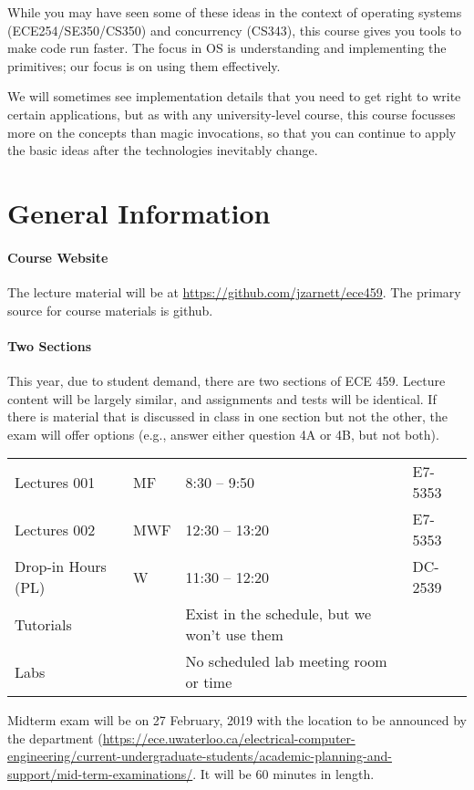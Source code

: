 \documentclass[letterpaper,10pt]{article}
\begin{document}
While you may have seen some of these ideas in the context of
operating systems (ECE254/SE350/CS350) and concurrency (CS343), this course gives you tools to make code run
faster. The focus in OS is understanding and implementing the
primitives; our focus is on using them effectively. 

We will sometimes see implementation details that you need to get right to write
certain applications, but as with any university-level course, this course
focusses more on the concepts than magic invocations, so that you can continue
to apply the basic ideas after the technologies inevitably change.


\section*{General Information}

\paragraph{Course Website} The lecture material will be at \url{https://github.com/jzarnett/ece459}. The primary source for course materials is github.


 \paragraph{Two Sections} This year, due to student demand, there are two sections of ECE 459. Lecture content will be largely similar, and assignments and tests will be identical. If there is material that is discussed in class in one section but not the other, the exam will offer options (e.g., answer either question 4A or 4B, but not both).


\noindent
\hspace*{2em} \begin{tabular}{l|ll|l}
  Lectures 001 & MF & 8:30 -- 9:50 & E7-5353\\ 
  Lectures 002 & MWF & 12:30 -- 13:20 & E7-5353\\
  Drop-in Hours (PL) & W & 11:30 -- 12:20 & DC-2539 \\
  Tutorials &  &  Exist in the schedule, but we won't use them& \\
  Labs &  &  No scheduled lab meeting room or time & \\
  \end{tabular}
  
Midterm exam will be on 27 February, 2019 with the location to be announced by the department (\url{https://ece.uwaterloo.ca/electrical-computer-engineering/current-undergraduate-students/academic-planning-and-support/mid-term-examinations/}. It will be 60 minutes in length.
  
\end{document}

